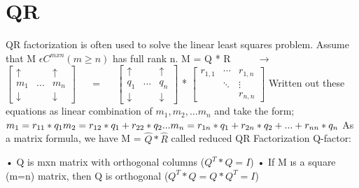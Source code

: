 \documentclass[]{finalproject}
\begin{document}
\section{QR} \label{qr}
\begin{flushleft}
QR factorization is often used to solve the linear least squares problem.
Assume that M $\epsilon C^{mxn} (m \geq n)$ has full rank n. 
\linebreak 
M = Q * R $\qquad$ $\longrightarrow$ $\qquad$
$\begin{bmatrix} 
\uparrow &  & \uparrow\\
m_{1} & ... & m_{n}\\
\downarrow & & \downarrow
\end{bmatrix}$
$\quad$ = $\quad$
$\begin{bmatrix} 
\uparrow &  & \uparrow\\
q_{1} & ... & q_{n}\\
\downarrow & & \downarrow
\end{bmatrix}$ *
$\begin{bmatrix} 
r_{1,1} & \cdots & r_{1,n}\\
 & \ddots & \vdots\\
 &  & r_{n,n}
\end{bmatrix}$ \linebreak \newline
Written out these equations as linear combination of $m_{1}, m_{2}, ... m_{n}$  and take the form; \newline
$m_{1} = r_{11}*q_{1} \newline
m_{2} = r_{12}*q_{1} + r_{22}*q_{2} \newline
. \newline
. \newline
. \newline
m_{n} = r_{1n}*q_{1} + r_{2n}*q_{2} +...+r_{nn}*q_{n} $
\newline
As a matrix formula, we have M = $\hat{Q} * \hat{R}$ called reduced QR Factorization \newline
Q-factor:
\begin{flushleft}
• Q is mxn matrix with orthogonal columns ($Q^{T}*Q = I$) \newline
• If M ıs a square (m=n) matrix, then Q is orthogonal ($Q^{T}*Q = Q*Q^{T} =I$)
\end{flushleft}  


\end{flushleft}
\end{document}
